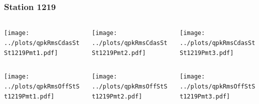 \documentclass[aspectratio=169]{beamer}
\begin{document}
\begin{frame} 
  \frametitle{Station 1219}
  \begin{center}
    \begin{columns}
      \begin{column}{0.33\textwidth}
        \texttt{[image: ../plots/qpkRmsCdasStSt1219Pmt1.pdf]}
      \end{column}
      \begin{column}{0.33\textwidth}
        \texttt{[image: ../plots/qpkRmsCdasStSt1219Pmt2.pdf]}
      \end{column}
      \begin{column}{0.33\textwidth}
        \texttt{[image: ../plots/qpkRmsCdasStSt1219Pmt3.pdf]}
      \end{column}
    \end{columns}
  \end{center}

  \begin{center}
    \begin{columns}
      \begin{column}{0.33\textwidth}
        \texttt{[image: ../plots/qpkRmsOffStSt1219Pmt1.pdf]}
      \end{column}
      \begin{column}{0.33\textwidth}
        \texttt{[image: ../plots/qpkRmsOffStSt1219Pmt2.pdf]}
      \end{column}
      \begin{column}{0.33\textwidth}
        \texttt{[image: ../plots/qpkRmsOffStSt1219Pmt3.pdf]}
      \end{column}
    \end{columns}
  \end{center}
\end{frame}
\end{document}
